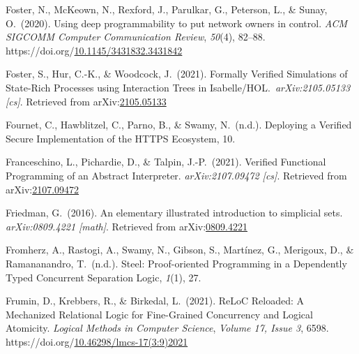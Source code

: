 \documentclass[12pt,twoside]{article}
\begin{document}
{\begin{thebibliography}{1079}
\mdbibitemlabel{}Foster, N., McKeown, N., Rexford, J., Parulkar, G., Peterson, L., \& Sunay, O.~(2020). Using deep programmability to put network owners in control. \emph{ACM SIGCOMM Computer Communication Review}, \emph{50}(4), 82–88. https://doi.org/\href{https://dx.doi.org/10.1145/3431832.3431842}{10.1145/3431832.3431842}%

\mdbibitemlabel{}Foster, S., Hur, C.-K., \& Woodcock, J.~(2021). Formally Verified Simulations of State-Rich Processes using Interaction Trees in Isabelle/HOL.~\emph{arXiv:2105.05133 {}[cs]}. Retrieved from arXiv:\href{http://arxiv.org/abs/2105.05133}{2105.05133}%

\mdbibitemlabel{}Fournet, C., Hawblitzel, C., Parno, B., \& Swamy, N.~(n.d.). Deploying a Veriﬁed Secure Implementation of the HTTPS Ecosystem, 10.%

\mdbibitemlabel{}Franceschino, L., Pichardie, D., \& Talpin, J.-P.~(2021). Verified Functional Programming of an Abstract Interpreter. \emph{arXiv:2107.09472 {}[cs]}. Retrieved from arXiv:\href{http://arxiv.org/abs/2107.09472}{2107.09472}%

\mdbibitemlabel{}Friedman, G.~(2016). An elementary illustrated introduction to simplicial sets. \emph{arXiv:0809.4221 {}[math]}. Retrieved from arXiv:\href{http://arxiv.org/abs/0809.4221}{0809.4221}%

\mdbibitemlabel{}Fromherz, A., Rastogi, A., Swamy, N., Gibson, S., Martínez, G., Merigoux, D., \& Ramananandro, T.~(n.d.). Steel: Proof-oriented Programming in a Dependently Typed Concurrent Separation Logic, \emph{1}(1), 27.%

\mdbibitemlabel{}Frumin, D., Krebbers, R., \& Birkedal, L.~(2021). ReLoC Reloaded: A Mechanized Relational Logic for Fine-Grained Concurrency and Logical Atomicity. \emph{Logical Methods in Computer Science}, \emph{Volume 17, Issue 3}, 6598. https://doi.org/\href{https://dx.doi.org/10.46298/lmcs-17\%25283:9\%25292021}{10.46298/lmcs-17(3:9)2021}%


\end{thebibliography}}
\end{document}
